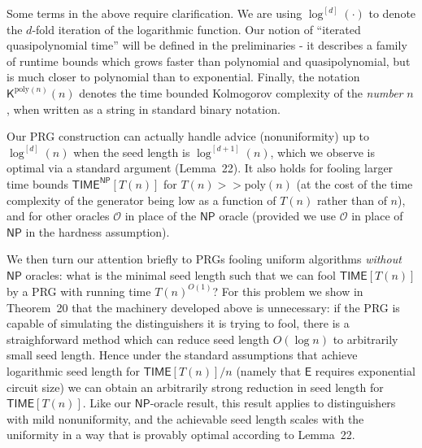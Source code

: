 \documentclass[10pt,a4paper]{article}
\begin{document}



Some terms in the above require clarification. We are using $\log^{[d]}(\cdot)$ to denote the $d$-fold iteration of the logarithmic function.
Our notion of “iterated quasipolynomial time” will be defined in the preliminaries - it describes a family of runtime bounds which grows faster than polynomial and quasipolynomial, but is much closer to polynomial than to exponential. Finally, the notation ${\mathsf{K}}^{\mathrm{poly}(n)}(n)$ denotes the time bounded Kolmogorov complexity of the \emph{number} $n$, when written as a string in standard binary notation.\par




Our PRG construction can actually handle advice (nonuniformity) up to $\log^{[d]}(n)$ when the seed length is $\log^{[d+1]}(n)$, which we observe is optimal via a standard argument (Lemma 22). It also holds for fooling larger time bounds ${\mathsf{TIME}}^{\mathsf{NP}}[T(n)]$ for $T(n)>>\mathrm{poly}(n)$ (at the cost of the time complexity of the generator being low as a function of $T(n)$ rather than of $n$), and for other oracles $\mathcal{O}$ in place of the ${\mathsf{NP}}$ oracle (provided we use $\mathcal{O}$ in place of ${\mathsf{NP}}$ in the hardness assumption).\par




We then turn our attention briefly to PRGs fooling uniform algorithms \emph{without} ${\mathsf{NP}}$ oracles: what is the minimal seed length such that we can fool ${\mathsf{TIME}}[T(n)]$ by a PRG with running time $T(n)^{O(1)}$? For this problem we show in Theorem 20 that the machinery developed above is unnecessary: if the PRG is capable of simulating the distinguishers it is trying to fool, there is a straighforward method which can reduce seed length $O(\log n)$ to arbitrarily small seed length. Hence under the standard assumptions that achieve logarithmic seed length for ${\mathsf{TIME}}[T(n)]/n$ (namely that ${\mathsf{E}}$ requires exponential circuit size) we can obtain an arbitrarily strong reduction in seed length for ${\mathsf{TIME}}[T(n)]$. Like our ${\mathsf{NP}}$-oracle result, this result applies to distinguishers with mild nonuniformity, and the achievable seed length scales with the uniformity in a way that is provably optimal according to Lemma 22.\par
\end{document}
